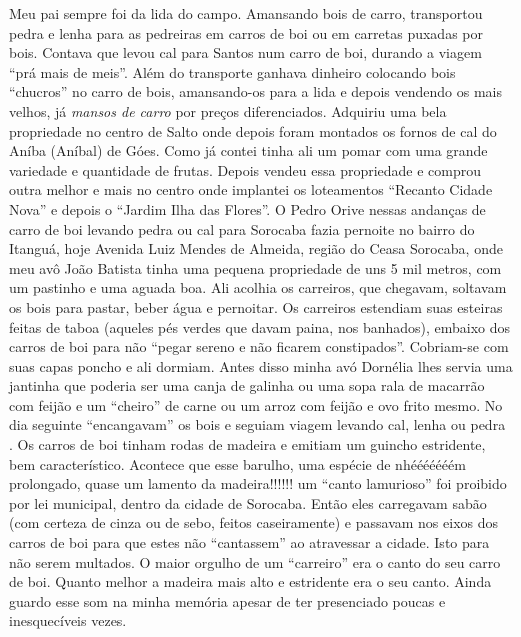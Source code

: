 \documentclass[12pt,brazil,]{book}
\begin{document}
Meu pai sempre foi da lida do campo. Amansando bois de carro,
transportou pedra e lenha para as pedreiras em carros de boi ou em
carretas puxadas por bois. Contava que levou cal para Santos num carro
de boi, durando a viagem ``prá mais de meis''. Além do transporte
ganhava dinheiro colocando bois ``chucros'' no carro de bois,
amansando-os para a lida e depois vendendo os mais velhos, já
\emph{mansos de carro} por preços diferenciados. Adquiriu uma bela
propriedade no centro de Salto onde depois foram montados os fornos de
cal do Aníba (Aníbal) de Góes. Como já contei tinha ali um pomar com uma
grande variedade e quantidade de frutas. Depois vendeu essa propriedade
e comprou outra melhor e mais no centro onde implantei os loteamentos
``Recanto Cidade Nova'' e depois o ``Jardim Ilha das Flores''. O Pedro
Orive nessas andanças de carro de boi levando pedra ou cal para Sorocaba
fazia pernoite no bairro do Itanguá, hoje Avenida Luiz Mendes de
Almeida, região do Ceasa Sorocaba, onde meu avô João Batista tinha uma
pequena propriedade de uns 5 mil metros, com um pastinho e uma aguada
boa. Ali acolhia os carreiros, que chegavam, soltavam os bois para
pastar, beber água e pernoitar. Os carreiros estendiam suas esteiras
feitas de taboa (aqueles pés verdes que davam paina, nos banhados),
embaixo dos carros de boi para não ``pegar sereno e não ficarem
constipados''. Cobriam-se com suas capas poncho e ali dormiam. Antes
disso minha avó Dornélia lhes servia uma jantinha que poderia ser uma
canja de galinha ou uma sopa rala de macarrão com feijão e um ``cheiro''
de carne ou um arroz com feijão e ovo frito mesmo. No dia seguinte
``encangavam'' os bois e seguiam viagem levando cal, lenha ou pedra . Os
carros de boi tinham rodas de madeira e emitiam um guincho estridente,
bem característico. Acontece que esse barulho, uma espécie de nhééééééém
prolongado, quase um lamento da madeira!!!!!! um ``canto lamurioso'' foi
proibido por lei municipal, dentro da cidade de Sorocaba. Então eles
carregavam sabão (com certeza de cinza ou de sebo, feitos caseiramente)
e passavam nos eixos dos carros de boi para que estes não ``cantassem''
ao atravessar a cidade. Isto para não serem multados. O maior orgulho de
um ``carreiro'' era o canto do seu carro de boi. Quanto melhor a madeira
mais alto e estridente era o seu canto. Ainda guardo esse som na minha
memória apesar de ter presenciado poucas e inesquecíveis vezes.
\end{document}
